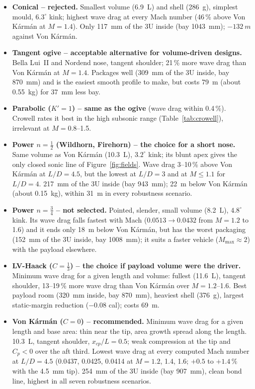 \begin{itemize}[leftmargin=*,itemsep=3pt]
\item \textbf{Conical -- rejected.} Smallest volume (\SI{6.9}{L}) and shell (\SI{286}{g}), simplest mould,
$6.3^\circ$ kink; highest wave drag at every Mach number (46\,\% above Von K\'arm\'an at $M=1.4$). Only
\SI{117}{mm} of the 3U inside (bay \SI{1043}{mm}); $-\SI{132}{m}$ against Von K\'arm\'an.
\item \textbf{Tangent ogive -- acceptable alternative for volume-driven designs.} Bella Lui~II and Nordend
nose, tangent shoulder; 21\,\% more wave drag than Von K\'arm\'an at $M=1.4$. Packages well (\SI{309}{mm}
of the 3U inside, bay \SI{870}{mm}) and is the easiest smooth profile to make, but costs \SI{79}{m}
(about \SI{0.55}{kg}) for \SI{37}{mm} less bay.
\item \textbf{Parabolic ($K' = 1$) -- same as the ogive} (wave drag within 0.4\,\%). Crowell rates it best
in the high subsonic range (Table~\ref{tab:crowell}), irrelevant at $M = 0.8$--1.5.
\item \textbf{Power $n = \tfrac12$ (Wildhorn, Firehorn) -- the choice for a short nose.} Same volume as
Von K\'arm\'an (\SI{10.3}{L}), $3.2^\circ$ kink; its blunt apex gives the only closed sonic line of
Figure~\ref{fig:fields}. Wave drag 3--10\,\% above Von K\'arm\'an at $L/D=4.5$, but the lowest at
$L/D = 3$ and at $M \leq 1.1$ for $L/D = 4$. \SI{217}{mm} of the 3U inside (bay \SI{943}{mm});
\SI{22}{m} below Von K\'arm\'an (about \SI{0.15}{kg}), within \SI{31}{m} in every robustness scenario.
\item \textbf{Power $n = \tfrac34$ -- not selected.} Pointed, slender, small volume (\SI{8.2}{L}),
$4.8^\circ$ kink. Its wave drag falls fastest with Mach ($0.0513 \rightarrow 0.0432$ from $M = 1.2$ to
1.6) and it ends only \SI{18}{m} below Von K\'arm\'an, but has the worst packaging (\SI{152}{mm} of the 3U
inside, bay \SI{1008}{mm}); it suits a faster vehicle ($M_{\max} \approx 2$) with the payload elsewhere.
\item \textbf{LV-Haack ($C = \tfrac13$) -- the choice if payload volume were the driver.} Minimum wave drag
for a given length and volume: fullest (\SI{11.6}{L}), tangent shoulder, 13--19\,\% more wave drag than
Von K\'arm\'an over $M = 1.2$--1.6. Best payload room (\SI{320}{mm} inside, bay \SI{870}{mm}), heaviest
shell (\SI{376}{g}), largest static-margin reduction ($-0.08$ cal); costs \SI{69}{m}.
\item \textbf{Von K\'arm\'an ($C = 0$) -- recommended.} Minimum wave drag for a given length and base area:
thin near the tip, area growth spread along the length. \SI{10.3}{L}, tangent shoulder, $x_{cp}/L = 0.5$;
weak compression at the tip and $C_p < 0$ over the aft third. Lowest wave drag at every computed Mach
number at $L/D = 4.5$ (0.0437, 0.0425, 0.0414 at $M = 1.2$, 1.4, 1.6; $+0.5$ to $+1.4\,\%$ with the
\SI{4.5}{mm} tip). \SI{254}{mm} of the 3U inside (bay \SI{907}{mm}), clean bond line, highest in all seven
robustness scenarios.
\end{itemize}

